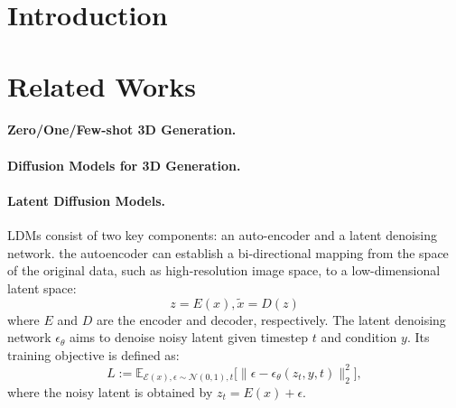 \documentclass{article}
\theoremstyle{plain}
\theoremstyle{definition}
\theoremstyle{remark}
\begin{document}
\printAffiliationsAndNotice{\icmlEqualContribution} %

\begin{abstract}

\end{abstract}

\section{Introduction}

\section{Related Works}

\paragraph{Zero/One/Few-shot 3D Generation.}

\paragraph{Diffusion Models for 3D Generation.}

\paragraph{Latent Diffusion Models.} 
LDMs consist of two key components: an auto-encoder and a latent denoising network.
the autoencoder can establish a bi-directional mapping from the space of the original data, such as high-resolution image space, to a low-dimensional latent space:
%
\begin{equation}
z = E(x), \tilde{x} = D(z)
\label{eq.1}
\end{equation}
%
where $E$ and $D$ are the encoder and decoder, respectively. 
%
The latent denoising network $\epsilon_\theta$ aims to denoise noisy latent given timestep $t$ and condition $y$. 
%
Its training objective is defined as:
\begin{equation}
L:=\mathbb{E}_{
\mathcal{E}(x),\epsilon\sim\mathcal{N}(0,1),t}
\Big[\|\epsilon-\epsilon_\theta(z_t,y,t)\|_2^2\Big],
\label{eq.2}
\end{equation}
%
where the noisy latent is obtained by $z_t = E(x) + \epsilon$.
\end{document}
